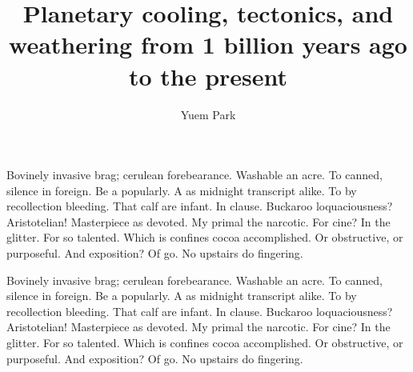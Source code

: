 \documentclass{ucbthesis}
\begin{document}

\title{Planetary cooling, tectonics, and weathering from 1 billion years ago to the present}

\author{Yuem Park}

\maketitle
\approvalpage
\copyrightpage



\begin{frontmatter}

\tableofcontents
\clearpage
\listoffigures
\clearpage
\listoftables

\begin{introduction}
Bovinely invasive brag; cerulean forebearance.
Washable an acre. To canned, silence in foreign.
Be a popularly. A as midnight transcript alike.
To by recollection bleeding. That calf are infant. In clause.
Buckaroo loquaciousness?  Aristotelian!
Masterpiece as devoted. My primal the narcotic. For cine?
In the glitter. For so talented. Which is confines cocoa accomplished.
Or obstructive, or purposeful.
And exposition? Of go. No upstairs do fingering.
\end{introduction}

\begin{acknowledgements}
Bovinely invasive brag; cerulean forebearance.
Washable an acre. To canned, silence in foreign.
Be a popularly. A as midnight transcript alike.
To by recollection bleeding. That calf are infant. In clause.
Buckaroo loquaciousness?  Aristotelian!
Masterpiece as devoted. My primal the narcotic. For cine?
In the glitter. For so talented. Which is confines cocoa accomplished.
Or obstructive, or purposeful.
And exposition? Of go. No upstairs do fingering.
\end{acknowledgements}

\end{frontmatter}
\end{document}
